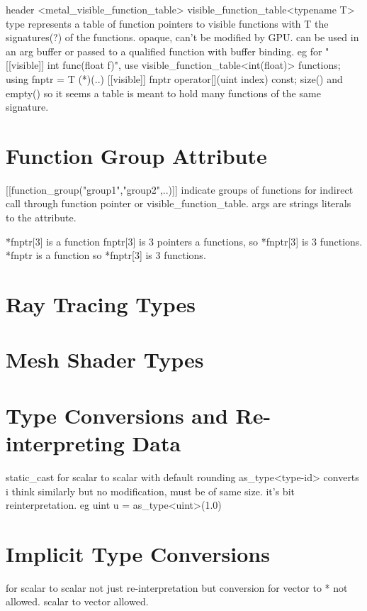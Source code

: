 header <metal_visible_function_table>
visible_function_table<typename T> type represents a table of function pointers to visible functions with T the signatures(?) of the functions.
opaque, can't be modified by GPU.
can be used in an arg buffer or passed to a qualified function with buffer binding.
eg
    for "[[visible]] int func(float f)", use visible_function_table<int(float)> functions;
    using fnptr = T (*)(..) [[visible]]
    fnptr operator[](uint index) const;
size() and empty()
so it seems a table is meant to hold many functions of the same signature. 

\section{Function Group Attribute}
[[function_group("group1","group2",..)]]
indicate groups of functions for indirect call through function pointer or visible_function_table.
args are strings literals to the attribute.

*fnptr[3] is a function
fnptr[3] is 3 pointers a functions, so *fnptr[3] is 3 functions.
*fnptr is a function so *fnptr[3] is 3 functions.

\section{Ray Tracing Types}
\section{Mesh Shader Types}

\section{Type Conversions and Re-interpreting Data}
static_cast for scalar to scalar with default rounding
as_type<type-id> converts i think similarly but no modification, must be of same size. it's bit reinterpretation. eg uint u = as_type<uint>(1.0)

\section{Implicit Type Conversions}

for scalar to scalar not just re-interpretation but conversion
for vector to * not allowed.
scalar to vector allowed. 


